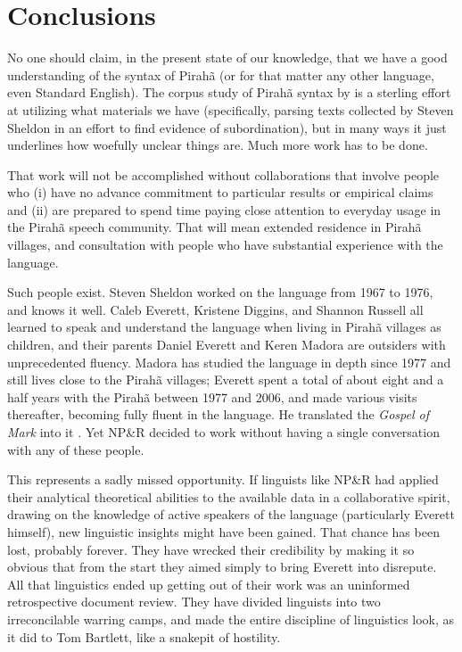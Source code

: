 \documentclass[output=paper,colorlinks,citecolor=brown
]{langscibook}
\begin{document}
\section{Conclusions}

No one should claim, in the present state of our knowledge, that we
have a good understanding of the syntax of Pirah{\~a} (or for that
matter any other language, even Standard English). The corpus study
of Pirah{\~a} syntax by \citet{FutrellEtAl16} is a sterling effort
at utilizing what materials we have (specifically, parsing texts
collected by Steven Sheldon in an effort to find evidence of
subordination), but in many ways it just underlines how woefully
unclear things are. Much more work has to be done.

That work will not be accomplished without collaborations that involve
people who (i) have no advance commitment to particular results or
empirical claims and (ii) are prepared to spend time paying close
attention to everyday usage in the Pirah{\~a} speech community. That
will mean extended residence in Pirah{\~a} villages, and consultation
with people who have substantial experience with the language.

Such people exist. Steven Sheldon worked on the language from
1967 to 1976, and knows it well. Caleb Everett, Kristene Diggins,
and Shannon Russell all learned to speak and understand the language
when living in Pirah{\~a} villages as children, and their parents
Daniel Everett and Keren Madora are outsiders with unprecedented
fluency. Madora has studied the language in depth since 1977 and
still lives close to the Pirah{\~a} villages; Everett spent a total
of about eight and a half years with the Pirah{\~a} between 1977
and 2006, and made various visits thereafter, becoming fully fluent
in the language. He translated the \textit{Gospel of Mark} into it
\citep{Everett86Mark}. Yet NP\&R decided to work without having a
single conversation with any of these people.

This represents a sadly missed opportunity. If linguists like NP\&R
had applied their analytical theoretical abilities to the available
data in a collaborative spirit, drawing on the knowledge of active
speakers of the language (particularly Everett himself), new linguistic
insights might have been gained. That chance has been lost, probably
forever. They have wrecked their credibility by making it so obvious
that from the start they aimed simply to bring Everett into disrepute.
All that linguistics ended up getting out of their work was an
uninformed retrospective document review. They have divided linguists
into two irreconcilable warring camps, and made the entire discipline
of linguistics look, as it did to Tom Bartlett, like a snakepit of
hostility.
\end{document}
